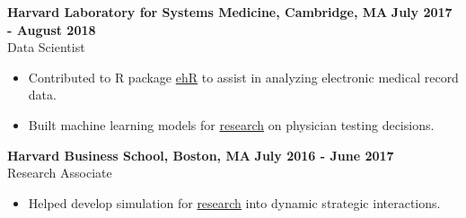 \documentclass[margin,line]{res}
\begin{document}
\begin{resume}
\textbf{Harvard Laboratory for Systems Medicine, Cambridge, MA} \hfill \textbf{July 2017 - August 2018} \\
Data Scientist \\
\begin{itemize} 
    \item Contributed to R package \href{https://github.com/sysmedlab/ehR}{ehR} to assist in analyzing electronic medical record data.
    \item Built machine learning models for \href{https://eml.berkeley.edu/~webfac/auerbach/w26168.pdf}{research} on physician testing decisions.
\end{itemize}

\textbf{Harvard Business School, Boston, MA} \hfill \textbf{July 2016 - June 2017} \\
Research Associate \\ 
\begin{itemize}
    \item Helped develop simulation for \href{https://www.hbs.edu/faculty/Publication%20Files/17-095_9c642396-3599-4250-a7a6-c25eec842a56.pdf}{research}
    into dynamic strategic interactions. 
\end{itemize}

\end{resume}
\end{document}
